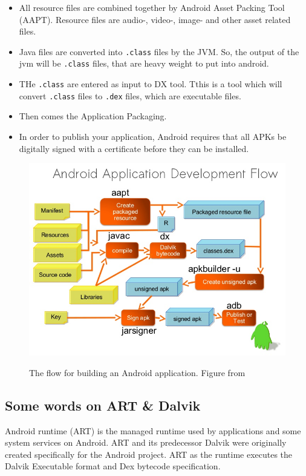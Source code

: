 \begin{itemize}
	\item All resource files are combined together by Android Asset Packing Tool (AAPT). Resource files are  audio-, video-, image-  and other asset related files. 
	\item Java files are converted into \texttt{.class} files by the JVM. So, the output of the jvm will be \texttt{.class} files, that are heavy weight to put into android. 	\item THe \texttt{.class}  are entered as input to DX tool. Tthis is a tool which will convert \texttt{.class} files to \texttt{.dex} files, which are  executable files. 
	\item Then comes the Application Packaging.	
	\item In order to publish your application, Android requires that all APKs be digitally signed with a certificate before they can be installed. 
\end{itemize}



\begin{figure}[hb]
	\includegraphics[width=\textwidth]{images/hello/development.jpg}
	\label{fig:develop}
	\caption{The flow for building an Android application. Figure from \cite{Limbani2014}}
\end{figure}

\subsection{Some words on ART \& Dalvik}
Android runtime (ART) \cite{Android2019} is the managed runtime used by applications and some system services on Android. ART and its predecessor Dalvik were originally created specifically for the Android project. ART as the runtime executes the Dalvik Executable format and Dex bytecode specification.

